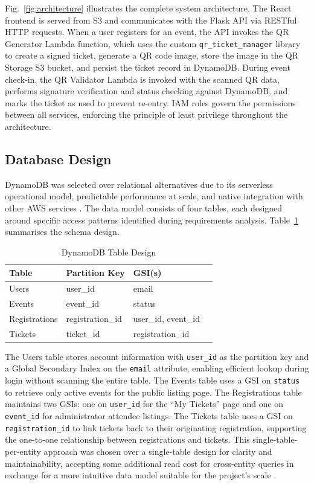 \documentclass[conference]{IEEEtran}
\begin{document}
Fig.~\ref{fig:architecture} illustrates the complete system architecture. The React frontend is served from S3 and communicates with the Flask API via RESTful HTTP requests. When a user registers for an event, the API invokes the QR Generator Lambda function, which uses the custom \texttt{qr\_ticket\_manager} library to create a signed ticket, generate a QR code image, store the image in the QR Storage S3 bucket, and persist the ticket record in DynamoDB. During event check-in, the QR Validator Lambda is invoked with the scanned QR data, performs signature verification and status checking against DynamoDB, and marks the ticket as used to prevent re-entry. IAM roles govern the permissions between all services, enforcing the principle of least privilege throughout the architecture.

\subsection{Database Design}

DynamoDB was selected over relational alternatives due to its serverless operational model, predictable performance at scale, and native integration with other AWS services \cite{aws2024dynamodb}. The data model consists of four tables, each designed around specific access patterns identified during requirements analysis. Table~\ref{tab:dynamodb} summarises the schema design.

\begin{table}[htbp]
\caption{DynamoDB Table Design}
\label{tab:dynamodb}
\centering
\begin{tabular}{@{}llll@{}}
\toprule
\textbf{Table} & \textbf{Partition Key} & \textbf{GSI(s)} \\
\midrule
Users & user\_id & email \\
Events & event\_id & status \\
Registrations & registration\_id & user\_id, event\_id \\
Tickets & ticket\_id & registration\_id \\
\bottomrule
\end{tabular}
\end{table}

The Users table stores account information with \texttt{user\_id} as the partition key and a Global Secondary Index on the \texttt{email} attribute, enabling efficient lookup during login without scanning the entire table. The Events table uses a GSI on \texttt{status} to retrieve only active events for the public listing page. The Registrations table maintains two GSIs: one on \texttt{user\_id} for the ``My Tickets'' page and one on \texttt{event\_id} for administrator attendee listings. The Tickets table uses a GSI on \texttt{registration\_id} to link tickets back to their originating registration, supporting the one-to-one relationship between registrations and tickets. This single-table-per-entity approach was chosen over a single-table design for clarity and maintainability, accepting some additional read cost for cross-entity queries in exchange for a more intuitive data model suitable for the project's scale \cite{dynamodbbook2020}.
\end{document}

